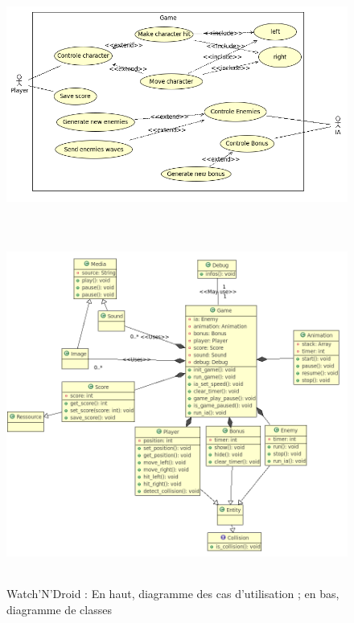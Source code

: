 \begin{figure}[h]
 \centering
 \includegraphics[height=8.5cm]{../umls/UML_images/WatchNDroid/utilisation} \hfill
 \includegraphics[height=11cm]{../umls/UML_images/WatchNDroid/class} \hfill
 \caption{Watch'N'Droid : En haut, diagramme des cas d'utilisation ; en bas, diagramme de classes}
\end{figure}

